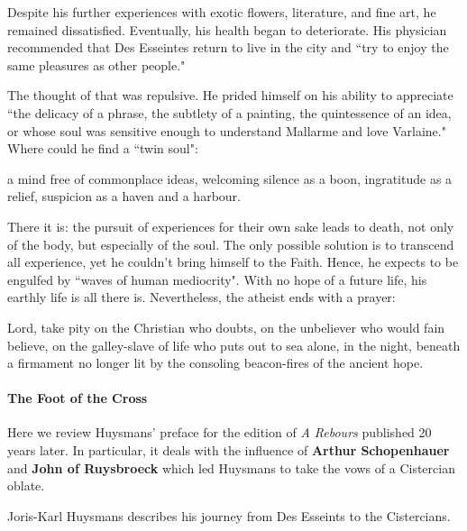 Despite his further experiences with exotic flowers, literature, and fine art, he remained dissatisfied. Eventually, his health began to deteriorate. His physician recommended that Des Esseintes return to live in the city and ``try to enjoy the same pleasures as other people."

The thought of that was repulsive. He prided himself on his ability to appreciate ``the delicacy of a phrase, the subtlety of a painting, the quintessence of an idea, or whose soul was sensitive enough to understand Mallarme and love Varlaine." Where could he find a ``twin soul":

\begin{quotex}
a mind free of commonplace ideas, welcoming silence as a boon, ingratitude as a relief, suspicion as a haven and a harbour. 

\end{quotex}
There it is: the pursuit of experiences for their own sake leads to death, not only of the body, but especially of the soul. The only possible solution is to transcend all experience, yet he couldn't bring himself to the Faith. Hence, he expects to be engulfed by ``waves of human mediocrity". With no hope of a future life, his earthly life is all there is. Nevertheless, the atheist ends with a prayer:

\begin{quotex}
Lord, take pity on the Christian who doubts, on the unbeliever who would fain believe, on the galley-slave of life who puts out to sea alone, in the night, beneath a firmament no longer lit by the consoling beacon-fires of the ancient hope. 

\end{quotex}

\paragraph{The Foot of the Cross}

Here we review Huysmans' preface for the edition of \emph{A Rebours} published 20 years later. In particular, it deals with the influence of \textbf{Arthur Schopenhauer} and \textbf{John of Ruysbroeck} which led Huysmans to take the vows of a Cistercian oblate.


\hfill

Joris-Karl Huysmans describes his journey from Des Esseints to the Cistercians. 

